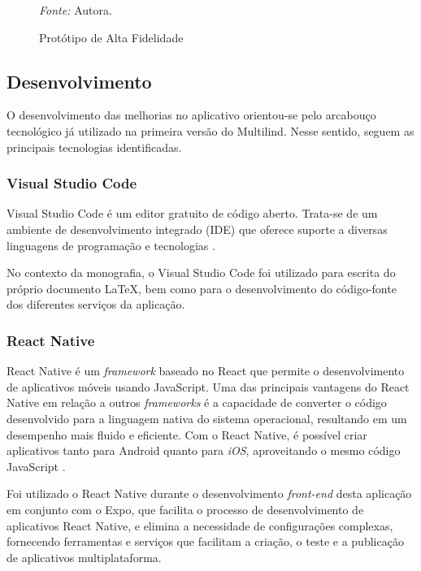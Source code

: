 \begin{figure}[h!]
	\centering
	\caption{Protótipo de Alta Fidelidade}
    \begin{tablenotes}[flushleft]
		\centering
		\item \textit{Fonte:} Autora.
	\end{tablenotes}
	\label{fig03}
\end{figure}

\subsection{Desenvolvimento}
\label{sec:Desenvolvimento}
O desenvolvimento das melhorias no aplicativo orientou-se pelo arcabouço tecnológico já utilizado na primeira versão do Multilind. Nesse sentido, seguem as 
principais tecnologias identificadas.

\subsubsection{Visual Studio Code}
\label{sec:Visual Studio Code}
Visual Studio Code é um editor gratuito de código aberto. Trata-se de um ambiente de desenvolvimento 
integrado (IDE) que oferece suporte a diversas linguagens de programação e tecnologias \cite{vscode}.

No contexto da monografia, o Visual Studio Code foi utilizado para escrita do próprio documento LaTeX, bem como para o desenvolvimento do código-fonte 
dos diferentes serviços da aplicação.

\subsubsection{React Native}
\label{sec:React Native}
React Native é um \textit{framework} baseado no React que permite o desenvolvimento de aplicativos móveis usando JavaScript. Uma das 
principais vantagens do React Native em relação a outros \textit{frameworks} é a capacidade de converter o código desenvolvido para a 
linguagem nativa do sistema operacional, resultando em um desempenho mais fluido e eficiente. Com o React Native, é possível 
criar aplicativos tanto para Android quanto para \textit{iOS}, aproveitando o mesmo código JavaScript \cite{reactnative}.

Foi utilizado o React Native durante o desenvolvimento \textit{front-end} desta aplicação em conjunto com o Expo, que facilita 
o processo de desenvolvimento de aplicativos React Native, e elimina a necessidade de configurações complexas, fornecendo ferramentas 
e serviços que facilitam a criação, o teste e a publicação de aplicativos multiplataforma.

